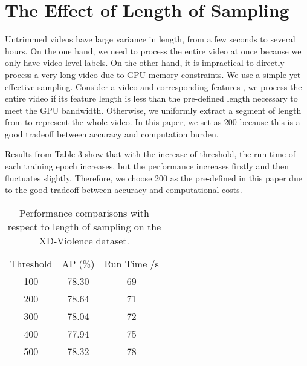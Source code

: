 \documentclass[runningheads]{llncs}
\begin{document}
\section{The Effect of Length of Sampling}
Untrimmed videos have large variance in length, from a few seconds to several hours. On the one hand, we need to process the entire video at once because we only have video-level labels. On the other hand, it is impractical to directly process a very long video due to GPU memory constraints. We use a simple yet effective sampling. Consider a video  and corresponding features , we process the entire video if its feature length  is less than the pre-defined   length necessary to meet the GPU bandwidth. Otherwise, we uniformly extract a segment of length   from  to represent the whole video. In this paper, we set  as 200 because this is a good tradeoff between accuracy and computation burden.

Results from Table 3 show that with the increase of threshold, the run time of each training epoch increases, but the performance increases firstly and then fluctuates slightly. Therefore, we choose 200 as the pre-defined   in this paper due to the good tradeoff between accuracy and computational costs.
\setlength{\tabcolsep}{4pt}
\begin{table}[t]
\begin{center}
\caption{Performance comparisons with respect to length of sampling on the XD-Violence dataset.}
\label{table:length}

\begin{tabular}{ccc}
\hline\noalign{\smallskip}
Threshold  &  AP (\%) & Run Time /s \\
\noalign{\smallskip}
\hline
\noalign{\smallskip}
100   & 78.30 & 69 \\
200   & 78.64 & 71 \\
300   & 78.04 & 72 \\
400   & 77.94 & 75 \\
500   & 78.32 & 78 \\
\hline
\end{tabular}
\end{center}
\end{table}
\end{document}
